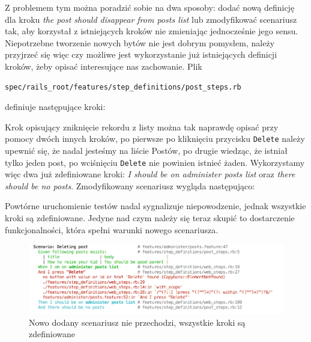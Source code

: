     Z problemem tym można poradzić sobie na dwa sposoby: dodać nową definicję dla kroku \emph{the post should disappear from posts list} lub zmodyfikować scenariusz tak, aby korzystał z istniejących kroków nie zmieniając jednocześnie jego sensu. Niepotrzebne tworzenie nowych bytów nie jest dobrym pomysłem, należy przyjrzeć się więc czy możliwe jest wykorzystanie już istniejących definicji kroków, żeby opisać interesujące nas zachowanie. Plik
    
\begin{lstlisting}
spec/rails_root/features/step_definitions/post_steps.rb
\end{lstlisting}
    
    definiuje następujące kroki:
    
    
    
    Krok opisujący zniknięcie rekordu z listy można tak naprawdę opisać przy pomocy dwóch innych kroków, po pierwsze po kliknięciu przycisku \texttt{Delete} należy upewnić się, że nadal jesteśmy na liście Postów, po drugie wiedząc, że istniał tylko jeden post, po wciśnięciu \texttt{Delete} nie powinien istnieć żaden. Wykorzystamy więc dwa już zdefiniowane kroki: \emph{I should be on administer posts list} oraz \emph{there should be no posts}. Zmodyfikowany scenariusz wygląda następująco:
    
    
    
    Powtórne uruchomienie testów nadal sygnalizuje niepowodzenie, jednak wszystkie kroki są zdefiniowane. Jedyne nad czym należy się teraz skupić to dostarczenie funkcjonalności, która spełni warunki nowego scenariusza.
     
     \clearpage
     
     \begin{figure}[!h]
   		\begin{center}
   			\includegraphics[width=\linewidth]{images/scenario_failure_2.png}
   			\caption{Nowo dodany scenariusz nie przechodzi, wszystkie kroki są zdefiniowane}
   			\label{scenario_failure_2}
   		\end{center}
   	\end{figure}
   	
